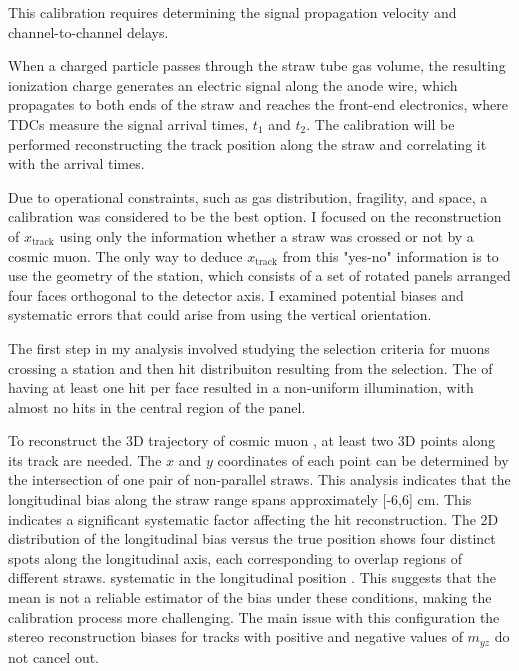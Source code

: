 This calibration requires determining the signal propagation velocity and 
channel-to-channel delays. 

When a charged particle passes through the straw tube gas volume, the 
resulting ionization charge generates an electric signal along the anode wire, 
which propagates to both ends of the straw and reaches the front-end 
electronics, where TDCs measure the signal arrival times, $t_1$ and $t_2$. 
The calibration will be performed  reconstructing the track position 
along the straw and correlating it with the arrival times. 

Due to operational constraints, such as  gas distribution, fragility, 
and space, a  calibration  was considered
to be the best option.
I focused on the reconstruction of $x_{\text{track}}$ using only the 
information  whether a straw was crossed or not by a cosmic muon. The only 
way to deduce $x_{\text{track}}$ from this "yes-no" information is to use the geometry of the  station, 
which consists of a set of rotated panels arranged  four faces orthogonal 
to the detector axis. I examined  potential 
biases and systematic errors that could arise from using the vertical orientation. 

The first step in my analysis involved studying the selection criteria for 
muons crossing a station and then  hit distribuiton  
resulting from the selection. 
The  of having at least one hit per face resulted in 
a non-uniform illumination, with almost no hits 
in the central region of the panel. 

To reconstruct the 3D trajectory of  cosmic muon
, at least 
two 3D points along its track are needed. The $x$ and $y$ coordinates 
of each point can be determined by the intersection of one pair of 
non-parallel straws. This analysis indicates that the longitudinal bias along the straw 
range spans approximately [-6,6] cm. This indicates a significant systematic factor 
affecting the hit reconstruction. 
The 2D distribution of the longitudinal bias versus the 
true position shows four distinct spots along the longitudinal axis, each corresponding 
to overlap regions of different straws. 
 systematic  in  
the  longitudinal position . 
This suggests that the mean is not a reliable estimator of the bias under 
these conditions, making the calibration process more challenging.
The main issue with this configuration  the stereo 
reconstruction biases for tracks with positive and negative values of $m_{yz}$
do not cancel  out. 

